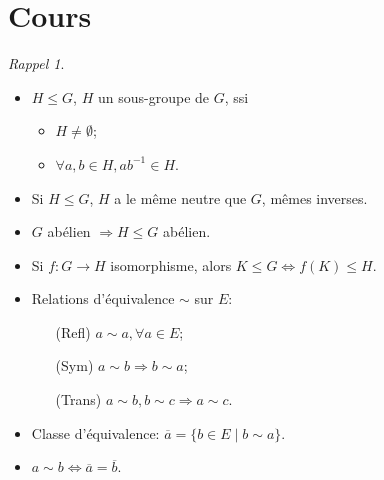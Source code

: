 \documentclass{report}
\newcounter{cours}
\newcommand*{\cours}{\section*{Cours \thecours}\stepcounter{cours}}
\theoremstyle{definition}
\theoremstyle{remark}
\newtheorem*{rappel}{Rappel}
\begin{document}
	\cours
	\begin{rappel}~

		\begin{itemize}[label=\textbullet]
			\item $H \leq G$, $H$ un sous-groupe de $G$, ssi
			\begin{itemize}
				\item $H \neq \emptyset$;
				\item $\forall a,b \in H, ab^{-1} \in H$.
			\end{itemize}
			\item Si $H \leq G$, $H$ a le m\^eme neutre que $G$, m\^emes inverses.
			\item $G$ ab\'elien $\Rightarrow H \leq G$ ab\'elien.
			\item Si $f:G \to H$ isomorphisme, alors $K \leq G \Leftrightarrow f(K) \leq H$.
			\item Relations d'\'equivalence $\sim$ sur $E$:
			\begin{itemize}
				\item[(Refl)] $a \sim a, \forall a \in E$;
				\item[(Sym)] $a \sim b \Rightarrow b \sim a$;
				\item[(Trans)] $a \sim b, b \sim c \Rightarrow a \sim c$.
			\end{itemize}
			\item Classe d'\'equivalence: $\overline{a} = \{b \in E \mid b \sim a\}$.
			\item $a \sim b \Longleftrightarrow \overline{a} = \overline{b}$.
		\end{itemize}
	\end{rappel}
\end{document}
